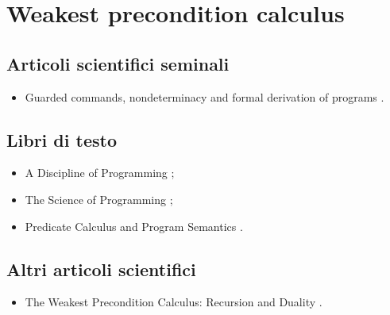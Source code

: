 \section*{Weakest precondition calculus}

\subsection*{Articoli scientifici seminali}
\begin{itemize}

\item Guarded commands, nondeterminacy and formal derivation of programs \cite{dijkstra1975wpc}.

\end{itemize}

\subsection*{Libri di testo}
\begin{itemize}

\item A Discipline of Programming \cite{dijkstra1976wpcbook};

\item The Science of Programming \cite{gries1987wpcbook};

\item Predicate Calculus and Program Semantics \cite{dijkstra1990wpcbook}.

\end{itemize}

\subsection*{Altri articoli scientifici}
\begin{itemize}

\item The Weakest Precondition Calculus: Recursion and Duality \cite{bonsangue1994wpc}.

\end{itemize}